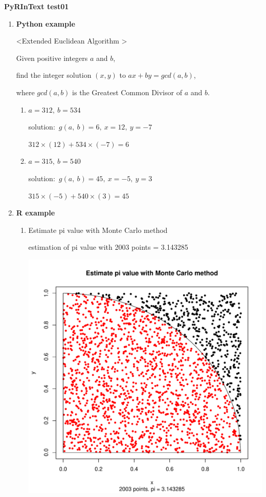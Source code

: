 \documentclass[a4paper]{article}
\begin{document}
	{\Large\bf PyRInText test01} %

	\begin{enumerate}
		\item {\bf Python example}

			\textless Extended Euclidean Algorithm \textgreater\vspace{1mm}\par
			Given positive integers $a$ and $b$,\par
			find the integer solution $(x, y)$ to $ax+by=gcd(a,b)$, \par
			where $gcd(a,b)$ is the Greatest Common Divisor of $a$ and $b$.
			\begin{enumerate}
				\item 
					$a= 312 ,~b= 534$\par
					solution:~$g(a,~b)=6,~x=12,~y=-7$\par
					$312\times(12)+534\times(-7)=6$
				\item 
					$a= 315 ,~b= 540$\par
					{\color{white}
					solution:~$g(a,~b)=45,~x=-5,~y=3$\par
					$315\times(-5)+540\times(3)=45$}

			\end{enumerate}

		\item {\bf R example}

			\begin{enumerate}
				\item Estimate pi value with Monte Carlo method\par
					estimation of pi value with 
						2003 points = 3.143285
					

					\includegraphics[scale=0.40,clip]{mc_pi.pdf}


\end{enumerate}
\end{enumerate}
\end{document}
